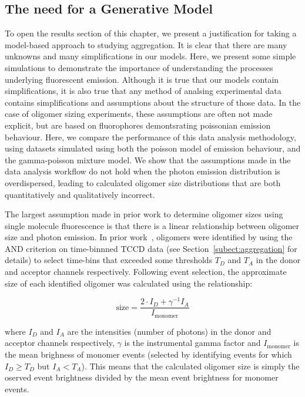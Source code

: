 \subsection{The need for a Generative Model}
To open the results section of this chapter, we present a justification for taking a model-based approach to studying aggregation. It is clear that there are many unknowns and many simplifications in our models. Here, we present some simple simulations to demonstrate the importance of understanding the processes underlying fluorescent emission. Although it is true that our models contain simplifications, it is also true that any method of analsing experimental data contains simplifications and assumptions about the structure of those data. In the case of oligomer sizing experiments, these assumptions are often not made explicit, but are based on fluorophores demontsrating poissonian emission behaviour. Here, we compare the performance of this data analysis methodology, using datasets simulated using both the poisson model of emission behaviour, and the gamma-poisson mixture model. We show that the assumptions made in the data analysis workflow do not hold when the photon emission distribution is overdispersed, leading to calculated oligomer size distributions that are both quantitatively and qualitatively incorrect. 

The largest assumption made in prior work to determine oligomer sizes using single molecule fluorescence is that there is a linear relationship between oligomer size and photon emission. In prior work~\cite{cremades2012}, oligomers were identified by using the AND criterion on time-binnned TCCD data (see Section~\ref{subect:aggregation} for details) to select time-bins that exceeded some thresholds $T_D$ and $T_A$ in the donor and acceptor channels respectively. Following event selection, the approximate size of each identified oligomer was calculated using the relationship:

\begin{equation}
\text{size} = \frac{2\cdot I_D + \gamma^{-1} I_A}{I_{\text{monomer}}}
\label{eq:size_linear}
\end{equation}

where $I_D$ and $I_A$ are the intensities (number of photons) in the donor and acceptor channels respectively, $\gamma$ is the instrumental gamma factor and $I_{\text{monomer}}$ is the mean brighness of monomer events (selected by identifying events for which $I_D \geq T_D$ but $I_A < T_A$). This means that the calculated oligomer size is simply the oserved event brightness divided by the mean event brightness for monomer events.


